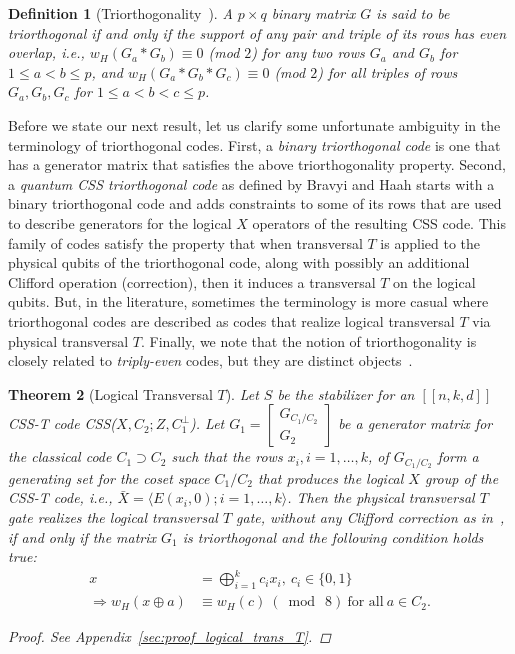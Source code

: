 \documentclass[twoside,romanappendices]{IEEEtran}
\newtheorem{theorem}{Theorem}
\newtheorem{definition}[theorem]{Definition}
\newcommand{\llbr}{[\![}
\newcommand{\rrbr}{]\!]}
\begin{document}
\begin{definition}[Triorthogonality~\cite{Bravyi-pra12}]
\label{def:triorthogonality}
A $p \times q$ binary matrix $G$ is said to be triorthogonal if and only if the support of any pair and triple of its rows has even overlap, i.e., $w_H(G_a \ast G_b) \equiv 0$ (mod $2$) for any two rows $G_a$ and $G_b$ for $1 \leq a < b \leq p$, and $w_H(G_a \ast G_b \ast G_c) \equiv 0$ (mod $2$) for all triples of rows $G_a, G_b, G_c$ for $1 \leq a < b < c \leq p$.
\end{definition}


Before we state our next result, let us clarify some unfortunate ambiguity in the terminology of triorthogonal codes.
First, a \emph{binary triorthogonal code} is one that has a generator matrix that satisfies the above triorthogonality property.
Second, a \emph{quantum CSS triorthogonal code} as defined by Bravyi and Haah starts with a binary triorthogonal code and adds constraints to some of its rows that are used to describe generators for the logical $X$ operators of the resulting CSS code.
This family of codes satisfy the property that when transversal $T$ is applied to the physical qubits of the triorthogonal code, along with possibly an additional Clifford operation (correction), then it induces a transversal $T$ on the logical qubits.
But, in the literature, sometimes the terminology is more casual where triorthogonal codes are described as codes that realize logical transversal $T$ via physical transversal $T$.
Finally, we note that the notion of triorthogonality is closely related to \emph{triply-even} codes, but they are distinct objects~\cite{Haah-pra18}.



\begin{theorem}[Logical Transversal $T$]
\label{thm:logical_trans_T}
Let $S$ be the stabilizer for an $\llbr n,k,d \rrbr$ CSS-T code CSS($X, C_2 ; Z, C_1^{\perp}$).
Let $G_1 = 
\begin{bmatrix}
G_{C_1/C_2} \\
G_2
\end{bmatrix}$ be a generator matrix for the classical code $C_1 \supset C_2$ such that the rows $x_i, i = 1,\ldots,k$, of $G_{C_1/C_2}$ form a generating set for the coset space $C_1/C_2$ that produces the logical $X$ group of the CSS-T code, i.e., $\bar{X} = \langle E(x_i,0) ; i = 1,\ldots,k \rangle$.
Then the physical transversal $T$ gate realizes the logical transversal $T$ gate, without any Clifford correction as in~\cite{Bravyi-pra12}, if and only if the matrix $G_1$ is triorthogonal and the following condition holds true:
\begin{align}
x & = \bigoplus_{i=1}^{k} c_i x_i,\ c_i \in \{0,1\} \nonumber \\
%
\Rightarrow w_H(x \oplus a) & \equiv w_H(c) \ (\bmod\ 8)\ \text{for\ all}\ a \in C_2.
\end{align}
\begin{proof}
See Appendix~\ref{sec:proof_logical_trans_T}.
\end{proof}
\end{theorem}
\end{document}
